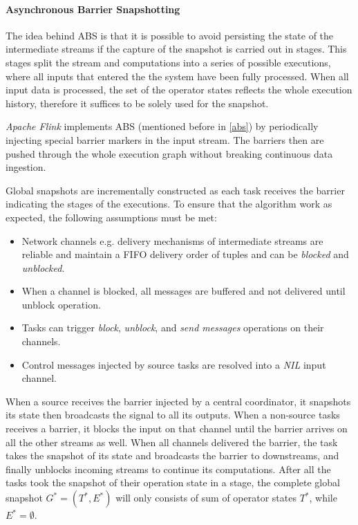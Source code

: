 \paragraph{Asynchronous Barrier Snapshotting}
 The idea behind ABS\cite{abs} is that it is possible to avoid persisting the state of the intermediate streams if the capture of the snapshot is carried out in stages. This stages split the stream and computations into a series of possible executions, where all inputs that entered the the system have been fully processed. When all input data is processed, the set of the operator states reflects the whole execution history, therefore it suffices to be solely used for the snapshot.

\textit{Apache Flink} implements ABS (mentioned before in \ref{abs}) by periodically injecting special barrier markers in the input stream. The barriers then are pushed through the whole execution graph without breaking continuous data ingestion.

Global snapshots are incrementally constructed as each task receives the barrier indicating the stages of the executions. To ensure that the algorithm work as expected, the following assumptions must be met:

\begin{itemize}
\item Network channels e.g. delivery mechanisms of intermediate streams are reliable and maintain a FIFO delivery order of tuples and can be 
\textit{blocked} and \textit{unblocked}.
\item When a channel is blocked, all messages are buffered and not delivered until unblock operation.
\item Tasks can trigger \textit{block}, \textit{unblock}, and \textit{send messages} operations on their channels.
\item Control messages injected by source tasks are resolved into a \textit{NIL} input channel.
\end{itemize}

When a source  receives the barrier injected by a central coordinator, it snapshots its state then broadcasts the signal to all its outputs. When a non-source tasks receives a barrier, it blocks the input on that channel until the barrier arrives on all the other streams as well. When all channels delivered the barrier, the task takes the snapshot of its state and broadcasts the barrier to downstreams, and finally unblocks incoming streams to continue its computations.
After all the tasks took the snapshot of their operation state in a stage, the complete global snapshot $G^{*} = (T^{*},E^{*})$ will only consists of sum of operator states $T^{*}$, while $E^{*}= \emptyset$.

